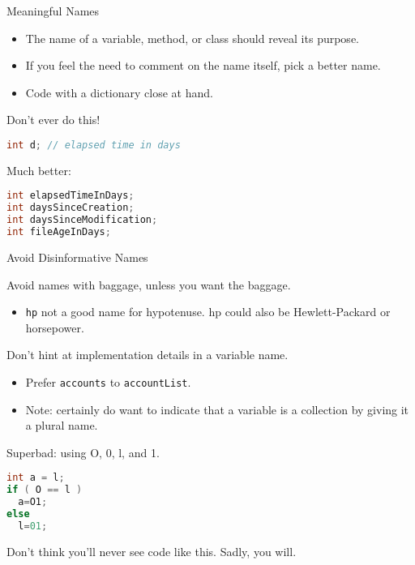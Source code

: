 \documentclass{beamer}
\begin{document}
\begin{frame}[fragile]{Meaningful Names}


\begin{itemize}
\item The name of a variable, method, or class should reveal its purpose.
\item If you feel the need to comment on the name itself, pick a better name.
\item Code with a dictionary close at hand.
\end{itemize}

Don't ever do this!
\begin{lstlisting}[language=Java]
int d; // elapsed time in days
\end{lstlisting}

Much better:
\begin{lstlisting}[language=Java]
int elapsedTimeInDays;
int daysSinceCreation;
int daysSinceModification;
int fileAgeInDays;
\end{lstlisting}


\end{frame}

\begin{frame}[fragile]{Avoid Disinformative Names}


Avoid names with baggage, unless you want the baggage.
\begin{itemize}
\item {\tt hp} not a good name for hypotenuse.  hp could also be Hewlett-Packard or horsepower.
\end{itemize}

Don't hint at implementation details in a variable name.
\begin{itemize}
\item Prefer {\tt accounts} to {\tt accountList}.
\item Note: certainly do want to indicate that a variable is a collection by giving it a plural name.
\end{itemize}

Superbad: using O, 0, l, and 1.
\begin{lstlisting}[language=Java]
int a = l;
if ( O == l )
  a=O1;
else
  l=01;
\end{lstlisting}
Don't think you'll never see code like this.  Sadly, you will.

\end{frame}
\end{document}
